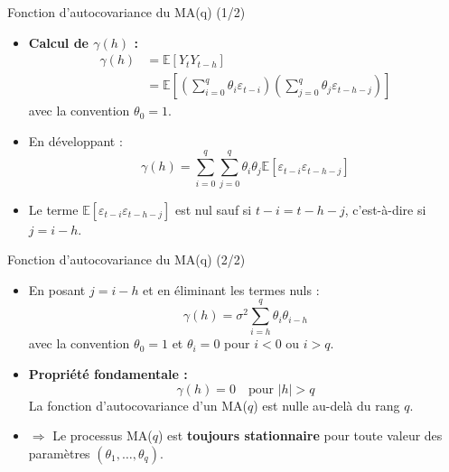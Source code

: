 \documentclass[11pt,aspectratio=169]{beamer}
\newcommand{\E}{\mathbb{E}}
\begin{document}
\begin{frame}{Fonction d'autocovariance du MA(q) (1/2)}

\begin{itemize}

\item \textbf{Calcul de $\gamma(h)$ :}
\begin{align*}
\gamma(h) &= \E[Y_t Y_{t-h}] \\
&= \E\left[\left(\sum_{i=0}^{q} \theta_i \varepsilon_{t-i}\right) \left(\sum_{j=0}^{q} \theta_j \varepsilon_{t-h-j}\right)\right]
\end{align*}
avec la convention $\theta_0 = 1$.\newline

\item En développant :
\[
\gamma(h) = \sum_{i=0}^{q} \sum_{j=0}^{q} \theta_i \theta_j \E[\varepsilon_{t-i} \varepsilon_{t-h-j}]
\]

\item Le terme $\E[\varepsilon_{t-i} \varepsilon_{t-h-j}]$ est nul sauf si $t-i = t-h-j$, c'est-à-dire si $j = i - h$.

\end{itemize}
\end{frame}

\begin{frame}{Fonction d'autocovariance du MA(q) (2/2)}

\begin{itemize}

\item En posant $j = i - h$ et en éliminant les termes nuls :
\[
\boxed{\gamma(h) = \sigma^2 \sum_{i=h}^{q} \theta_i \theta_{i-h}}
\]
avec la convention $\theta_0 = 1$ et $\theta_i = 0$ pour $i < 0$ ou $i > q$.\newline

\item \textbf{Propriété fondamentale :} \[
\gamma(h) = 0 \quad \text{pour } |h| > q
\]
La fonction d'autocovariance d'un MA($q$) est nulle au-delà du rang $q$.\newline

\item $\Rightarrow$ Le processus MA($q$) est \textbf{toujours stationnaire} pour toute valeur des paramètres $(\theta_1, \ldots, \theta_q)$.

\end{itemize}
\end{frame}
\end{document}
